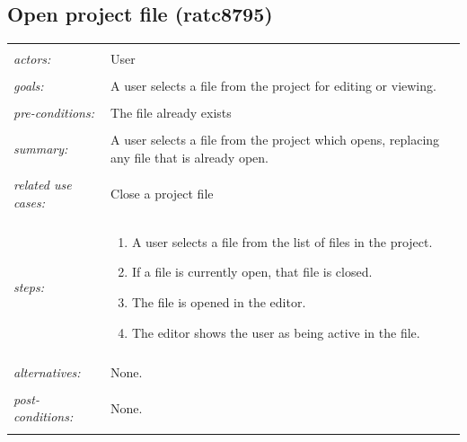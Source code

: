\documentclass[11pt]{report}
\begin{document}
\subsection{Open project file (ratc8795)}
\begin{tabular}{ p{2cm} p{12cm} }
 \hline
 \\
 \textit{actors:} & User \\ 
 \\
 \textit{goals:} & A user selects a file from the project for editing or viewing. \\
 \\
 \textit{pre-conditions:} & The file already exists \\
 \\
 \textit{summary:} & A user selects a file from the project which opens, replacing any file that is already open. \\ 
 \\
 \textit{related use cases:} & Close a project file \\ 
 \\
 \textit{steps:} & \begin{enumerate}
  \item A user selects a file from the list of files in the project.
  \item If a file is currently open, that file is closed.
  \item The file is opened in the editor.
  \item The editor shows the user as being active in the file.
 \end{enumerate} \\
 \\
 \textit{alternatives:} & None. \\
 \\
 \textit{post-conditions:} & None. \\
 \\
\hline
\end{tabular}
\end{document}
